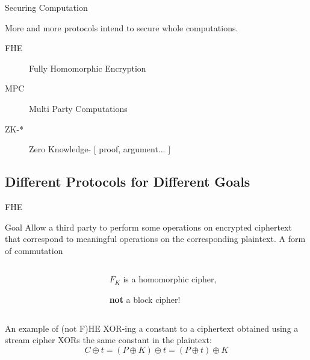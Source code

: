 \documentclass[presentation,aspectratio=1610]{beamer}
\begin{document}
\begin{frame}{Securing Computation}
  \begin{center}
    {\Large More and more protocols intend to secure whole \alert{computations}.}

    \vspace{0.8cm}
    
    \begin{description}
    \item[FHE] \alert{F}ully \alert{H}omomorphic \alert{E}ncryption
    \item[MPC] \alert{M}ulti \alert{P}arty \alert{C}omputations
    \item[ZK-*] \alert{Z}ero \alert{K}nowledge- $[$ proof, argument... $]$
    \end{description}
  \end{center}
\end{frame}


\subsection{Different Protocols for Different Goals}

\begin{frame}{FHE}
  \begin{exampleblock}{Goal}
    Allow a third party to perform some operations on encrypted ciphertext that correspond to meaningful operations on the corresponding plaintext. \hfill \pause \alert{A form of commutation}    
  \end{exampleblock}

  \pause

  \begin{columns}
    \begin{column}{0.55\textwidth}
      \begin{center}
      \end{center}
    \end{column}
    \begin{column}{0.4\textwidth}
      $F_K$ is a homomorphic cipher,

      \textbf{not} a block cipher!
    \end{column}
  \end{columns}

  \pause

  \begin{alertblock}{An example of (not F)HE}
    XOR-ing a constant to a ciphertext obtained using a stream cipher XORs the same constant in the plaintext:
    \begin{equation*}
      C \oplus t  = (P \oplus K) \oplus t = (P \oplus t) \oplus K
    \end{equation*}
  \end{alertblock}
\end{frame}
\end{document}
